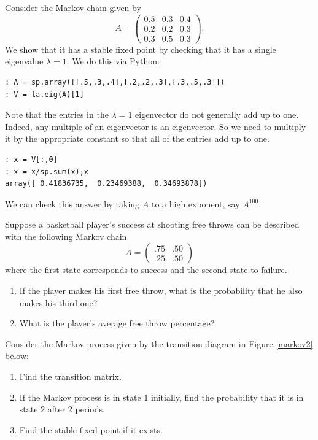 Consider the Markov chain given by
\[
A = \begin{pmatrix}
0.5 & 0.3 & 0.4\\
0.2 & 0.2 & 0.3\\
0.3 & 0.5 & 0.3
\end{pmatrix}.
\]
We show that it has a stable fixed point by checking that it has a single eigenvalue $\lambda=1$.
We do this via Python:
\begin{lstlisting}[style=python]
: A = sp.array([[.5,.3,.4],[.2,.2,.3],[.3,.5,.3]])
: V = la.eig(A)[1]
\end{lstlisting}
Note that the entries in the $\lambda=1$ eigenvector do not generally add up to one.
Indeed, any multiple of an eigenvector is an eigenvector.
So we need to multiply it by the appropriate constant so that all of the entries add up to one.
\begin{lstlisting}[style=python]
: x = V[:,0]
: x = x/sp.sum(x);x
array([ 0.41836735,  0.23469388,  0.34693878])
\end{lstlisting}
We can check this answer by taking $A$ to a high exponent, say $A^{100}$.

\begin{problem}
Suppose a basketball player's success at shooting free throws can be described with the following Markov chain
\[
A = \begin{pmatrix}.75&.50\\.25&.50\end{pmatrix}
\]
where the first state corresponds to success and the second state to failure.
\begin{enumerate}
\item If the player makes his first free throw, what is the probability that he also makes his third one?
\item What is the player's average free throw percentage?
\end{enumerate}
\end{problem}

\begin{problem}
Consider the Markov process given by the transition diagram in Figure \ref{markov2} below:
\begin{enumerate}
\item Find the transition matrix.
\item If the Markov process is in state 1 initially, find the probability that it is in state 2 after 2 periods.
\item Find the stable fixed point if it exists.
\end{enumerate}
\end{problem}

